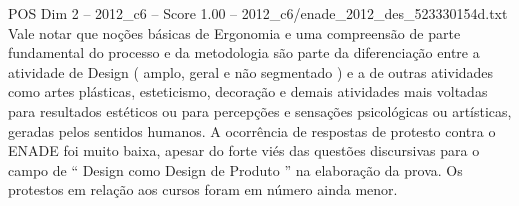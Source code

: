 \begin{textsample}{POS Dim 2 – 2012\_c6 – Score 1.00 – 2012\_c6/enade\_2012\_des\_523330154d.txt}
Vale notar que noções básicas de Ergonomia e uma compreensão de parte fundamental do processo e da metodologia são parte da diferenciação entre a atividade de Design ( amplo, geral e não segmentado ) e a de outras atividades como artes plásticas, esteticismo, decoração e demais atividades mais voltadas para resultados estéticos ou para percepções e sensações psicológicas ou artísticas, geradas pelos sentidos humanos.
A ocorrência de respostas de protesto contra o ENADE foi muito baixa, apesar do forte viés das questões discursivas para o campo de “ Design como Design de Produto ” na elaboração da prova.
Os protestos em relação aos cursos foram em número ainda menor.

\end{textsample}
